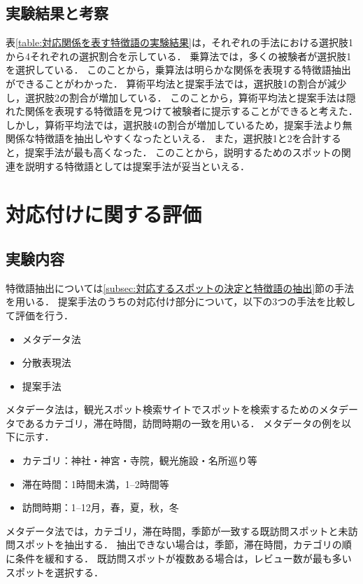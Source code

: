 \documentclass[submit]{ipsj}
\begin{document}
\subsection{実験結果と考察}
表\ref{table:対応関係を表す特徴語の実験結果}は，それぞれの手法における選択肢1から4それぞれの選択割合を示している．
乗算法では，多くの被験者が選択肢1を選択している．
このことから，乗算法は明らかな関係を表現する特徴語抽出ができることがわかった．
算術平均法と提案手法では，選択肢1の割合が減少し，選択肢2の割合が増加している．
このことから，算術平均法と提案手法は隠れた関係を表現する特徴語を見つけて被験者に提示することができると考えた．
しかし，算術平均法では，選択肢4の割合が増加しているため，提案手法より無関係な特徴語を抽出しやすくなったといえる．
また，選択肢1と2を合計すると，提案手法が最も高くなった．
このことから，説明するためのスポットの関連を説明する特徴語としては提案手法が妥当といえる．

\section{対応付けに関する評価}
\label{sec:対応付けに関する評価}
\subsection{実験内容}
特徴語抽出については\ref{subsec:対応するスポットの決定と特徴語の抽出}節の手法を用いる．
提案手法のうちの対応付け部分について，以下の3つの手法を比較して評価を行う．
\begin{itemize}
  \item メタデータ法
  \item 分散表現法
  \item 提案手法
\end{itemize}

メタデータ法は，観光スポット検索サイトでスポットを検索するためのメタデータであるカテゴリ，滞在時間，訪問時期の一致を用いる．
メタデータの例を以下に示す．
\begin{itemize}
 \item カテゴリ：神社・神宮・寺院，観光施設・名所巡り等
 \item 滞在時間：1時間未満，1--2時間等
 \item 訪問時期：1--12月，春，夏，秋，冬
\end{itemize}

メタデータ法では，カテゴリ，滞在時間，季節が一致する既訪問スポットと未訪問スポットを抽出する．
抽出できない場合は，季節，滞在時間，カテゴリの順に条件を緩和する．
既訪問スポットが複数ある場合は，レビュー数が最も多いスポットを選択する．
\end{document}
